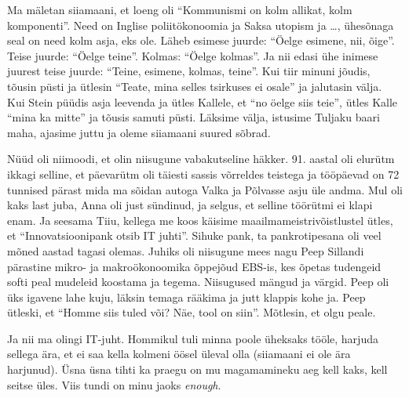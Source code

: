 Ma mäletan siiamaani, et loeng oli \enquote{Kommunismi on kolm allikat, kolm komponenti}. Need on Inglise poliitökonoomia ja Saksa utopism ja \ldots, ühesõnaga seal on need kolm asja, eks ole.  Läheb esimese juurde: \enquote{Öelge esimene, nii, õige}. Teise juurde: \enquote{Öelge teine}. Kolmas: \enquote{Öelge kolmas}. Ja nii edasi ühe inimese juurest teise juurde: \enquote{Teine, esimene, kolmas, teine}. Kui tiir minuni jõudis, tõusin püsti ja ütlesin \enquote{Teate, mina selles tsirkuses ei osale} ja jalutasin välja. Kui Stein püüdis asja leevenda ja ütles Kallele, et \enquote{no öelge siis teie}, ütles Kalle \enquote{mina ka mitte} ja tõusis samuti püsti. Läksime välja, istusime Tuljaku baari maha, ajasime juttu ja oleme siiamaani suured sõbrad.


Nüüd oli niimoodi, et olin niisugune vabakutseline häkker. 91. aastal oli elurütm ikkagi selline, et päevarütm oli täiesti sassis võrreldes teistega ja tööpäevad on 72 tunnised pärast mida ma sõidan autoga Valka ja Põlvasse asju üle andma. Mul oli kaks last juba, Anna oli just sündinud, ja selgus, et selline töörütmi ei klapi enam. Ja seesama Tiiu, kellega me koos käisime maailmameistrivõistlustel ütles, et \enquote{Innovatsioonipank otsib IT juhti}. Sihuke pank, ta pankrotipesana oli veel mõned aastad tagasi olemas. Juhiks oli niisugune mees  nagu Peep Sillandi pärastine mikro- ja makroökonoomika õppejõud EBS-is, kes õpetas tudengeid softi peal mudeleid koostama ja tegema. Niisugused mängud ja värgid. Peep oli üks igavene lahe kuju, läksin temaga rääkima ja jutt klappis kohe ja. Peep ütleski, et \enquote{Homme siis tuled või? Näe, tool on siin}. Mõtlesin, et olgu peale. 

Ja nii ma olingi IT-juht. Hommikul tuli minna poole üheksaks tööle, harjuda sellega ära, et ei saa kella kolmeni öösel üleval olla (siiamaani ei ole ära harjunud). Üsna üsna tihti ka praegu on mu magamamineku aeg kell kaks, kell seitse üles. Viis tundi on minu jaoks \emph{enough}. 

